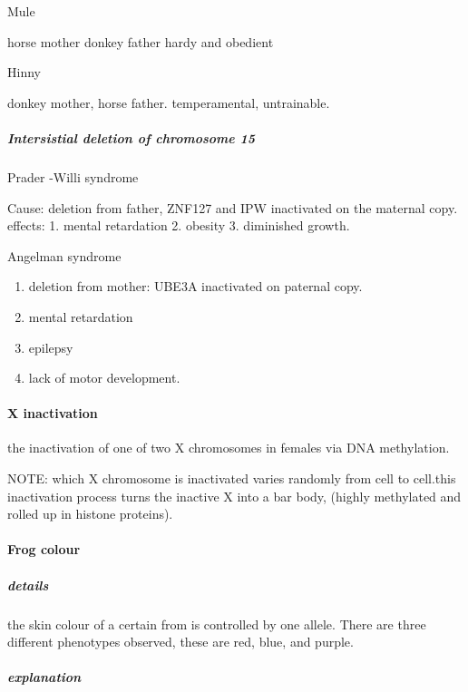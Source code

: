 \documentclass[]{article}
\providecommand{\tightlist}{%
  \setlength{\itemsep}{0pt}\setlength{\parskip}{0pt}}
\let\oldparagraph\paragraph
\renewcommand{\paragraph}[1]{\oldparagraph{#1}\mbox{}}
\let\oldsubparagraph\subparagraph
\renewcommand{\subparagraph}[1]{\oldsubparagraph{#1}\mbox{}}
\begin{document}
Mule

horse mother donkey father hardy and obedient

Hinny

donkey mother, horse father. temperamental, untrainable.

\hypertarget{intersistial-deletion-of-chromosome-15}{%
\subparagraph{Intersistial deletion of chromosome
15}\label{intersistial-deletion-of-chromosome-15}}

Prader -Willi syndrome

Cause: deletion from father, ZNF127 and IPW inactivated on the maternal
copy.\\
effects: 1. mental retardation 2. obesity 3. diminished growth.

Angelman syndrome

\begin{enumerate}
\def\labelenumi{\arabic{enumi}.}
\tightlist
\item
  deletion from mother: UBE3A inactivated on paternal copy.\\
\item
  mental retardation
\item
  epilepsy
\item
  lack of motor development.
\end{enumerate}

\hypertarget{x-inactivation}{%
\paragraph{X inactivation}\label{x-inactivation}}

the inactivation of one of two X chromosomes in females via DNA
methylation.

NOTE: which X chromosome is inactivated varies randomly from cell to
cell.this inactivation process turns the inactive X into a bar body,
(highly methylated and rolled up in histone proteins).

\hypertarget{frog-colour}{%
\paragraph{Frog colour}\label{frog-colour}}

\hypertarget{details}{%
\subparagraph{details}\label{details}}

the skin colour of a certain from is controlled by one allele. There are
three different phenotypes observed, these are red, blue, and purple.

\hypertarget{explanation}{%
\subparagraph{explanation}\label{explanation}}
\end{document}
